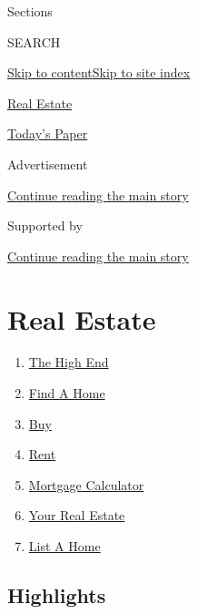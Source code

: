Sections

SEARCH

\protect\hyperlink{site-content}{Skip to
content}\protect\hyperlink{site-index}{Skip to site index}

\href{https://www.nytimes3xbfgragh.onion/section/realestate}{Real
Estate}

\href{https://myaccount.nytimes3xbfgragh.onion/auth/login?response_type=cookie\&client_id=vi}{}

\href{https://www.nytimes3xbfgragh.onion/section/todayspaper}{Today's
Paper}

Advertisement

\protect\hyperlink{after-top}{Continue reading the main story}

Supported by

\protect\hyperlink{after-sponsor}{Continue reading the main story}

\hypertarget{real-estate}{%
\section{Real Estate}\label{real-estate}}

\begin{enumerate}
\def\labelenumi{\arabic{enumi}.}
\tightlist
\item
  \href{/realestate/the-high-end}{The High End}
\item
  \href{/real-estate/find-a-home}{Find A Home}
\item
  \href{/real-estate/homes-for-sale}{Buy}
\item
  \href{/real-estate/homes-for-rent}{Rent}
\item
  \href{/real-estate/mortgage-calculator}{Mortgage Calculator}
\item
  \href{/real-estate/my-real-estate}{Your Real Estate}
\item
  \href{https://nytimesads.gtspayments.com/}{List A Home}
\end{enumerate}

\hypertarget{highlights}{%
\subsection{Highlights}\label{highlights}}

